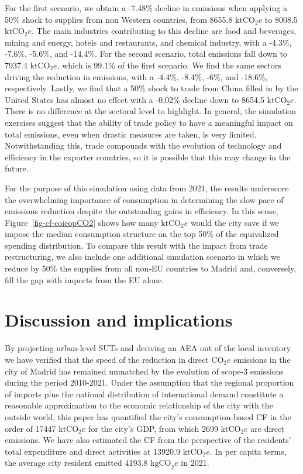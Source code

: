 \documentclass[
  10pt,
  twocolumn]{aft}
\begin{document}
For the first scenario, we obtain a -7.48\% decline in emissions when
applying a 50\% shock to supplies from non Western countries, from
8655.8 \(\text{ktCO}_2e\) to 8008.5 \(\text{ktCO}_2e\). The main
industries contributing to this decline are food and beverages, mining
and energy, hotels and restaurants, and chemical industry, with a
-4.3\%, -7.6\%, -5.6\%, and -14.4\%. For the second scenario, total
emissions fall down to 7937.4 \(\text{ktCO}_2e\), which is 99.1\% of the
first scenario. We find the same sectors driving the reduction in
emissions, with a -4.4\%, -8.4\%, -6\%, and -18.6\%, respectively.
Lastly, we find that a 50\% shock to trade from China filled in by the
United States has almost no effect with a -0.02\% decline down to 8654.5
\(\text{ktCO}_2e\). There is no difference at the sectoral level to
highlight. In general, the simulation exercises suggest that the ability
of trade policy to have a meaningful impact on total emissions, even
when drastic measures are taken, is very limited. Notwithstanding this,
trade compounds with the evolution of technology and efficiency in the
exporter countries, so it is possible that this may change in the
future.

For the purpose of this simulation using data from 2021, the results
underscore the overwhelming importance of consumption in determining the
slow pace of emissions reduction despite the outstanding gains in
efficiency. In this sense, Figure~\ref{fig-cf-coicopCO2} shows how many
\(\text{ktCO}_2e\) would the city save if we impose the median
consumption structure on the top 50\% of the equivalized spending
distribution. To compare this result with the impact from trade
restructuring, we also include one additional simulation scenario in
which we reduce by 50\% the supplies from all non-EU countries to Madrid
and, conversely, fill the gap with imports from the EU alone.

\section{Discussion and implications}\label{sec-implications}

By projecting urban-level SUTs and deriving an AEA out of the local
inventory we have verified that the speed of the reduction in direct
\(\text{CO}_2e\) emissions in the city of Madrid has remained unmatched
by the evolution of scope-3 emissions during the period 2010-2021. Under
the assumption that the regional proportion of imports plus the national
distribution of international demand constitute a reasonable
approximation to the economic relationship of the city with the outside
world, this paper has quantified the city's consumption-based CF in the
order of 17447 \(\text{ktCO}_2e\) for the city's GDP, from which 2699
\(\text{ktCO}_2e\) are direct emissions. We have also estimated the CF
from the perspective of the residents' total expenditure and direct
activities at 13920.9 \(\text{ktCO}_2e\). In per capita terms, the
average city resident emitted 4193.8 \(\text{kgCO}_2e\) in 2021.
\end{document}
